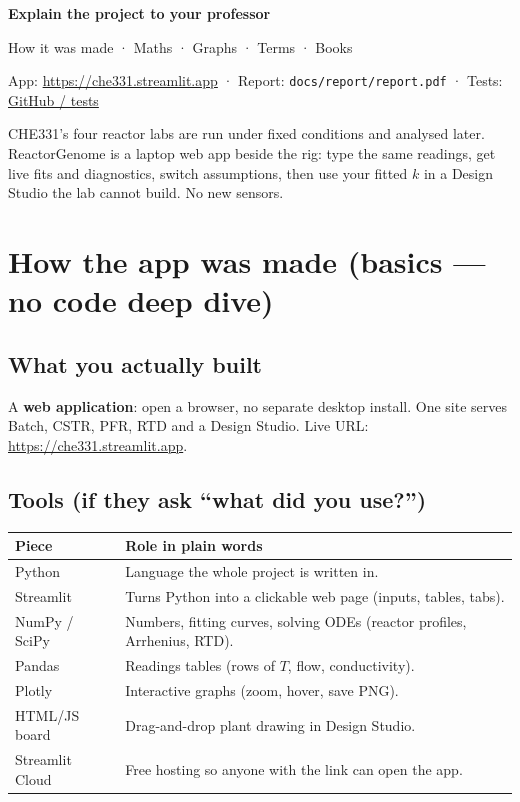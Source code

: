 \documentclass[11pt,a4paper]{article}
\begin{document}
\begin{center}
{\sffamily\bfseries\fontsize{24}{28}\selectfont\color{accent} Explain the project to your professor\par}
\vspace{0.2cm}
{\large\sffamily How it was made · Maths · Graphs · Terms · Books\par}
\vspace{0.35cm}
{\small App: \url{https://che331.streamlit.app}
\quad·\quad
Report: \texttt{docs/report/report.pdf}
\quad·\quad
Tests: \href{https://github.com/Mayurdp2403/ReactorGenome/tree/main/tests}{GitHub / tests}}
\end{center}

\begin{pitchbox}
CHE331's four reactor labs are run under fixed conditions and analysed later. ReactorGenome is a laptop web app beside the
rig: type the same readings, get live fits and diagnostics, switch assumptions, then use your fitted \(k\) in a Design
Studio the lab cannot build. No new sensors.
\end{pitchbox}

\section{How the app was made (basics --- no code deep dive)}

\subsection{What you actually built}
A \textbf{web application}: open a browser, no separate desktop install. One site serves Batch, CSTR, PFR, RTD and a
Design Studio. Live URL: \url{https://che331.streamlit.app}.

\subsection{Tools (if they ask ``what did you use?'')}
\begin{tabularx}{\textwidth}{@{}l L@{}}
\toprule
\textbf{Piece} & \textbf{Role in plain words} \\
\midrule
Python & Language the whole project is written in. \\
Streamlit & Turns Python into a clickable web page (inputs, tables, tabs). \\
NumPy / SciPy & Numbers, fitting curves, solving ODEs (reactor profiles, Arrhenius, RTD). \\
Pandas & Readings tables (rows of \(T\), flow, conductivity). \\
Plotly & Interactive graphs (zoom, hover, save PNG). \\
HTML/JS board & Drag-and-drop plant drawing in Design Studio. \\
Streamlit Cloud & Free hosting so anyone with the link can open the app. \\
\bottomrule
\end{tabularx}
\end{document}
